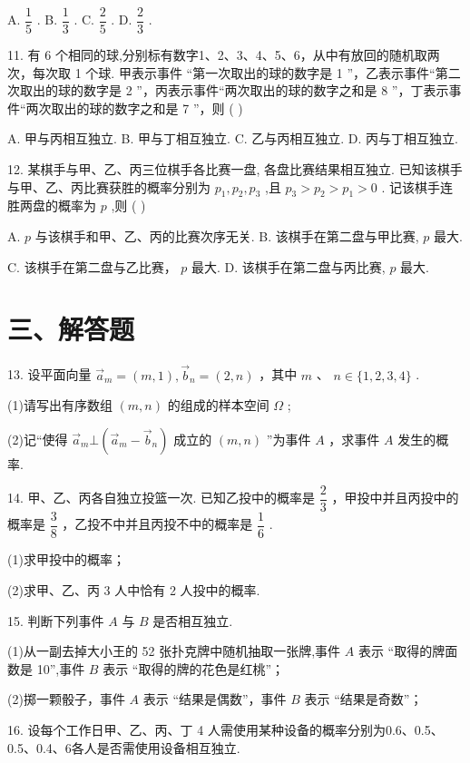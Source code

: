 A. $\dfrac{1}{5}$ . B. $\dfrac{1}{3}$ . C. $\dfrac{2}{5}$ . D. $\dfrac{2}{3}$ .

11. 有 6 个相同的球,分别标有数字1、2、3、4、5、6，从中有放回的随机取两次，每次取 1 个球. 甲表示事件 “第一次取出的球的数字是 1 ”，乙表示事件“第二次取出的球的数字是 2 ”，丙表示事件“两次取出的球的数字之和是 8 ”，丁表示事件“两次取出的球的数字之和是 7 ”，则 ( )

A. 甲与丙相互独立. B. 甲与丁相互独立. C. 乙与丙相互独立. D. 丙与丁相互独立.

12. 某棋手与甲、乙、丙三位棋手各比赛一盘, 各盘比赛结果相互独立. 已知该棋手与甲、乙、丙比赛获胜的概率分别为 ${p}_{1},{p}_{2},{p}_{3}$ ,且 ${p}_{3} > {p}_{2} > {p}_{1} > 0$ . 记该棋手连胜两盘的概率为 $p$ ,则 ( )

A. $p$ 与该棋手和甲、乙、丙的比赛次序无关. B. 该棋手在第二盘与甲比赛, $p$ 最大.

C. 该棋手在第二盘与乙比赛， $p$ 最大. D. 该棋手在第二盘与丙比赛, $p$ 最大.

\section*{三、解答题}

13. 设平面向量 ${\overrightarrow{a}}_{m} = \left( {m,1}\right) ,{\overrightarrow{b}}_{n} = \left( {2,n}\right)$ ，其中 $m$ 、 $n \in  \{ 1,2,3,4\}$ .

(1)请写出有序数组 $\left( {m,n}\right)$ 的组成的样本空间 $\Omega$ ;

(2)记“使得 ${\overrightarrow{a}}_{m} \bot  \left( {{\overrightarrow{a}}_{m} - {\overrightarrow{b}}_{n}}\right)$ 成立的 $\left( {m,n}\right)$ ”为事件 $A$ ，求事件 $A$ 发生的概率.

14. 甲、乙、丙各自独立投篮一次. 已知乙投中的概率是 $\dfrac{2}{3}$ ，甲投中并且丙投中的概率是 $\dfrac{3}{8}$ ，乙投不中并且丙投不中的概率是 $\dfrac{1}{6}$ .

(1)求甲投中的概率；

(2)求甲、乙、丙 3 人中恰有 2 人投中的概率.

15. 判断下列事件 $A$ 与 $B$ 是否相互独立.

(1)从一副去掉大小王的 52 张扑克牌中随机抽取一张牌,事件 $A$ 表示 “取得的牌面数是 10”,事件 $B$ 表示 “取得的牌的花色是红桃”；

(2)掷一颗骰子，事件 $A$ 表示 “结果是偶数”，事件 $B$ 表示 “结果是奇数”；

16. 设每个工作日甲、乙、丙、丁 4 人需使用某种设备的概率分别为0.6、0.5、0.5、0.4、6各人是否需使用设备相互独立.

